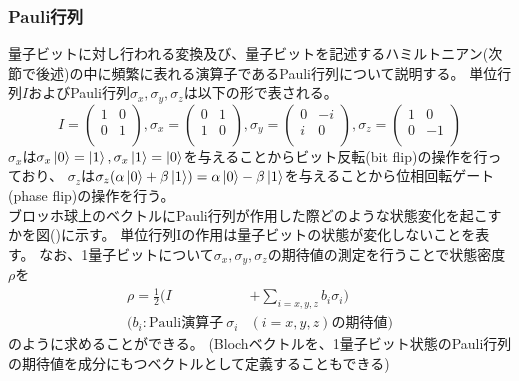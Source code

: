         \subsubsection{Pauli行列}
        量子ビットに対し行われる変換及び、量子ビットを記述するハミルトニアン(次節で後述)の中に頻繁に表れる演算子であるPauli行列について説明する。
        単位行列$I$およびPauli行列$\sigma_x,\sigma_y,\sigma_z$は以下の形で表される。
        \begin{equation}
            I=\left(
                \begin{array}{cc}
                    1 & 0 \\
                    0 & 1 \\
                \end{array}
              \right),
            \sigma_x=
              \left(
                \begin{array}{cc}
                    0 & 1 \\
                    1 & 0 \\
                \end{array}
              \right),
            \sigma_y=
              \left(
                \begin{array}{cc}
                    0 & -i \\
                    i & 0 \\
                \end{array}
              \right),
            \sigma_z=\left(
                \begin{array}{cc}
                    1 & 0 \\
                    0 & -1 \\
                \end{array}
              \right)
        \end{equation}
        $\sigma_x$は$\sigma_x \ket{0}=\ket{1}, \sigma_x \ket{1}=\ket{0}$を与えることからビット反転(bit flip)の操作を行っており、
        $\sigma_z$は$\sigma_z (\alpha\ket{0}+\beta\ket{1})=\alpha\ket{0}-\beta\ket{1}$を与えることから位相回転ゲート(phase flip)の操作を行う。\\
        ブロッホ球上のベクトルにPauli行列が作用した際どのような状態変化を起こすかを図()に示す。
        単位行列Iの作用は量子ビットの状態が変化しないことを表す。
        なお、1量子ビットについて$\sigma_x,\sigma_y,\sigma_z$の期待値の測定を行うことで状態密度$\rho$を
        \begin{equation}
        \begin{split}
            \rho  = \frac{1}{2}(I &+ \sum_{i=x,y,z} b_i \sigma_i)\\
            (b_i :\mathrm{Pauli演算子}\:\sigma_i&(i=x,y,z)\mathrm{の期待値})
        \end{split}
        \end{equation}
        のように求めることができる。
        (Blochベクトルを、1量子ビット状態のPauli行列の期待値を成分にもつベクトルとして定義することもできる)

